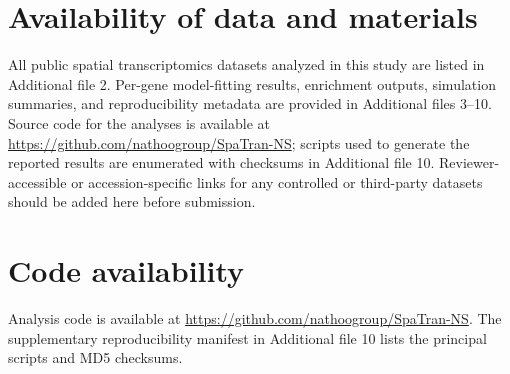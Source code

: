 \section*{Availability of data and materials}
All public spatial transcriptomics datasets analyzed in this study are listed in Additional file 2. Per-gene model-fitting results, enrichment outputs, simulation summaries, and reproducibility metadata are provided in Additional files 3--10. Source code for the analyses is available at \url{https://github.com/nathoogroup/SpaTran-NS}; scripts used to generate the reported results are enumerated with checksums in Additional file 10. Reviewer-accessible or accession-specific links for any controlled or third-party datasets should be added here before submission.

\section*{Code availability}
Analysis code is available at \url{https://github.com/nathoogroup/SpaTran-NS}. The supplementary reproducibility manifest in Additional file 10 lists the principal scripts and MD5 checksums.
